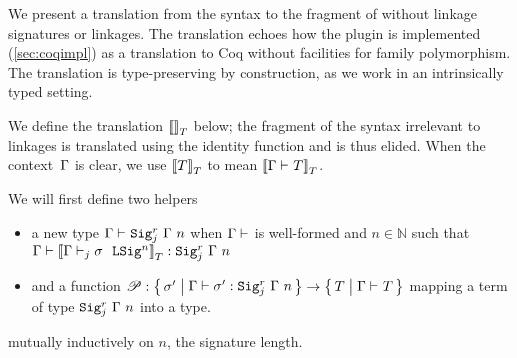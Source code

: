 We present a translation from the \TT syntax to the fragment of \TT without
linkage signatures or linkages.
The translation echoes how the \Lang plugin is implemented (\cref{sec:coqimpl})
as a translation to Coq without facilities for family polymorphism.
The translation is type-preserving by construction, as we work in an
intrinsically typed setting.

%
 


We define the translation $\denotesT{}$ below; the fragment of the syntax
irrelevant to linkages is translated using the identity function and is thus elided.
When the context~$\Gm$ is clear, we use $\denotesT{T}$ to mean $\denotesT{\goodType{\Gamma}{T}{}}$.

We will first define two helpers
\begin{itemize}
  \item a new type $\goodType{\Gamma}{\Sigr{\Gamma}{n}{j}}{}$  when
  $\goodCtx{\Gamma}{}$  is well-formed and $n \in \mathbb{N}$
  such that $\goodTerm{\Gm}{\denotesT{\goodSigU{j}{\Gamma}{\lsig}{n}}}{\Sigr{\Gm}{n}{j}}$
  \item and a function $\mathscr{P} : \setc{\lsig'}{ \goodTerm{\Gm}{\lsig'}{\Sigr{\Gm}{n}{j}} } \to \setc{T}{ \goodType{\Gm}{T}{} }$ mapping a term of type $\Sigr{\Gm}{n}{j}$ into a type.
\end{itemize}
mutually inductively on $n$, the signature length.

